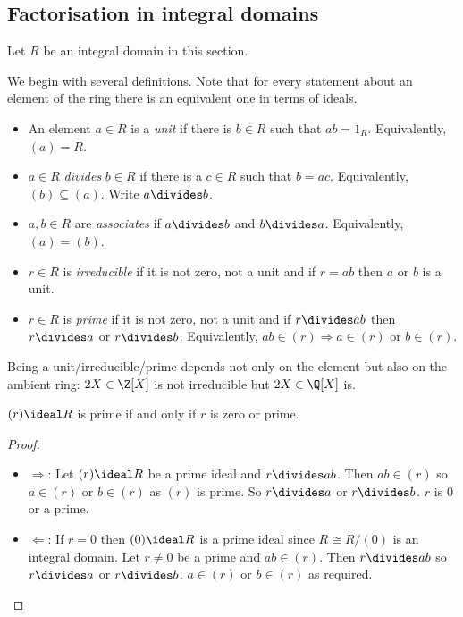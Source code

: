 \documentclass[a4paper]{article}
\theoremstyle{definition}
\begin{document}
\subsection{Factorisation in integral domains}

Let \(R\) be an integral domain in this section.

We begin with several definitions. Note that for every statement about an element of the ring there is an equivalent one in terms of ideals.

\begin{definition}\leavevmode
  \begin{itemize}
  \item An element \(a \in R\) is a \emph{unit} if there is \(b \in R\) such that \(ab = 1_R\). Equivalently, \((a) = R\).
  \item \(a \in R\) \emph{divides} \(b \in R\) if there is a \(c \in R\) such that \(b = ac\). Equivalently, \((b) \subseteq (a)\). Write \(a \divides b\).
  \item \(a, b \in R\) are \emph{associates} if \(a \divides b\) and \(b \divides a\). Equivalently, \((a) = (b)\).
  \item \(r \in R\) is \emph{irreducible} if it is not zero, not a unit and if \(r = ab\) then \(a\) or \(b\) is a unit.
  \item \(r \in R\) is \emph{prime} if it is not zero, not a unit and if \(r \divides ab\) then \(r \divides a\) or \(r \divides b\). Equivalently, \(ab \in (r) \Rightarrow a \in (r) \text{ or } b \in (r)\).
  \end{itemize}
\end{definition}

\begin{remark}
  Being a unit/irreducible/prime depends not only on the element but also on the ambient ring: \(2X \in \Z[X]\) is not irreducible but \(2X \in \Q[X]\) is.
\end{remark}

\begin{lemma}
  \((r) \ideal R\) is prime if and only if \(r\) is zero or prime.
\end{lemma}

\begin{proof}\leavevmode
  \begin{itemize}
  \item \(\Rightarrow\): Let \((r) \ideal R\) be a prime ideal and \(r \divides ab\). Then \(ab \in (r)\) so \(a \in (r)\) or \(b \in (r)\) as \((r)\) is prime. So \(r \divides a\) or \(r \divides b\). \(r\) is \(0\) or a prime.
  \item \(\Leftarrow\): If \(r = 0\) then \((0) \ideal R\) is a prime ideal since \(R \cong R/(0)\) is an integral domain. Let \(r \neq 0\) be a prime and \(ab \in (r)\). Then \(r \divides ab\) so \(r \divides a\) or \(r \divides b\). \(a \in (r)\) or \(b \in (r)\) as required.
  \end{itemize}
\end{proof}
\end{document}
